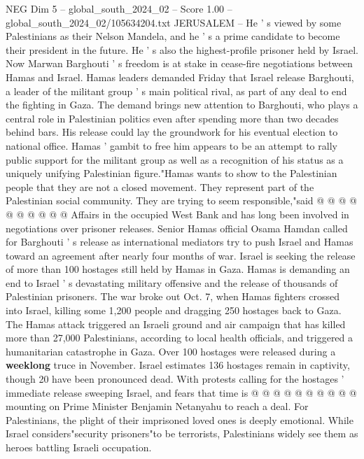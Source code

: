 \begin{textsample}{NEG Dim 5 – global\_south\_2024\_02 – Score 1.00 – global\_south\_2024\_02/105634204.txt}  \label{ex:f5_neg_259}
JERUSALEM -- He ' s viewed by some Palestinians as their Nelson Mandela, and he ' s a prime candidate to become their president in the future.
He ' s also the highest-profile prisoner held by Israel.
Now Marwan Barghouti ' s freedom is at stake in cease-fire negotiations between Hamas and Israel.
Hamas leaders demanded Friday that Israel release Barghouti, a leader of the militant group ' s main political rival, as part of any deal to end the fighting in Gaza.
The demand brings new attention to Barghouti, who plays a central role in Palestinian politics even after spending more than two decades behind bars.
His release could lay the groundwork for his eventual election to national office.
Hamas ' gambit to free him appears to be an attempt to rally public support for the militant group as well as a recognition of his status as a uniquely unifying Palestinian figure."Hamas wants to show to the Palestinian people that they are not a closed movement.
They represent part of the Palestinian social community.
They are trying to seem responsible,"said @ @ @ @ @ @ @ @ @ @ Affairs in the occupied West Bank and has long been involved in negotiations over prisoner releases.
Senior Hamas official Osama Hamdan called for Barghouti ' s release as international mediators try to push Israel and Hamas toward an agreement after nearly four months of war.
Israel is seeking the release of more than 100 hostages still held by Hamas in Gaza.
Hamas is demanding an end to Israel ' s devastating military offensive and the release of thousands of Palestinian prisoners.
The war broke out Oct. 7, when Hamas fighters crossed into Israel, killing some 1,200 people and dragging 250 hostages back to Gaza.
The Hamas attack triggered an Israeli ground and air campaign that has killed more than 27,000 Palestinians, according to local health officials, and triggered a humanitarian catastrophe in Gaza.
Over 100 hostages were released during a \textbf{weeklong} truce in November.
Israel estimates 136 hostages remain in captivity, though 20 have been pronounced dead.
With protests calling for the hostages ' immediate release sweeping Israel, and fears that time is @ @ @ @ @ @ @ @ @ @ mounting on Prime Minister Benjamin Netanyahu to reach a deal.
For Palestinians, the plight of their imprisoned loved ones is deeply emotional.
While Israel considers"security prisoners"to be terrorists, Palestinians widely see them as heroes battling Israeli occupation.

\end{textsample}
